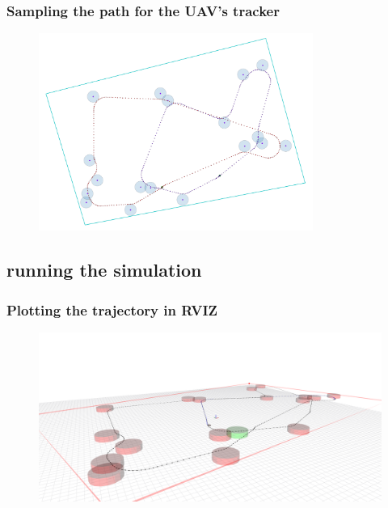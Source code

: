 \documentclass[aspectratio=1610]{beamer}
\begin{document}
\begin{frame}
  \frametitle{Sampling the path for the UAV's tracker}

  \begin{figure}
    \includegraphics[width=0.8\textwidth]{./fig/tsp_dubins_sampled.png}
  \end{figure}

\end{frame}

\subsection{running the simulation}

\begin{frame}
  \frametitle{Plotting the trajectory in RVIZ}

  \begin{figure}
    \includegraphics[width=1.0\textwidth]{./fig/rviz_1.png}
  \end{figure}

\end{frame}
\end{document}
